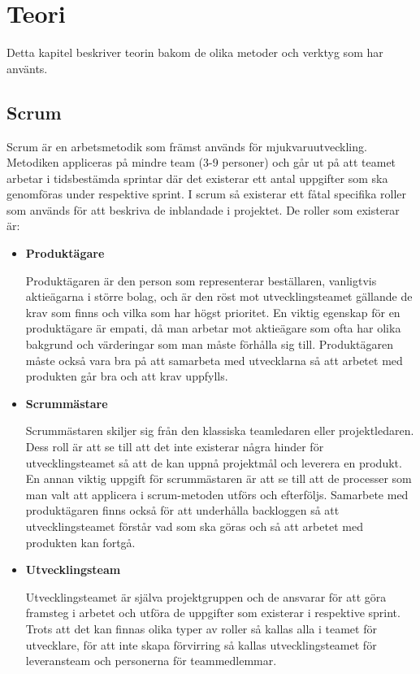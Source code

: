 \chapter{Teori}
Detta kapitel beskriver teorin bakom de olika metoder och verktyg som har använts.

\section{Scrum} \label{scrum}
Scrum är en arbetsmetodik som främst används för mjukvaruutveckling. Metodiken appliceras på mindre team (3-9 personer) och går ut på att teamet arbetar i tidsbestämda sprintar där det existerar ett antal uppgifter som ska genomföras under respektive sprint.
I scrum så existerar ett fåtal specifika roller som används för att beskriva de inblandade i projektet. De roller som existerar är:

\begin{itemize}
	\item \textbf{Produktägare}
	
	Produktägaren är den person som representerar beställaren, vanligtvis aktieägarna i större bolag, och är den röst mot utvecklingsteamet gällande de krav som finns och vilka som har högst prioritet. En viktig egenskap för en produktägare är empati, då man arbetar mot aktieägare som ofta har olika bakgrund och värderingar som man måste förhålla sig till. Produktägaren måste också vara bra på att samarbeta med utvecklarna så att arbetet med produkten går bra och att krav uppfylls.
	
	\item \textbf{Scrummästare}
	
	Scrummästaren skiljer sig från den klassiska teamledaren eller projektledaren. Dess roll är att se till att det inte existerar några hinder för utvecklingsteamet så att de kan uppnå projektmål och leverera en produkt. En annan viktig uppgift för scrummästaren är att se till att de processer som man valt att applicera i scrum-metoden utförs och efterföljs. Samarbete med produktägaren finns också för att underhålla backloggen så att utvecklingsteamet förstår vad som ska göras och så att arbetet med produkten kan fortgå.
	
	\item \textbf{Utvecklingsteam}
	
	Utvecklingsteamet är själva projektgruppen och de ansvarar för att göra framsteg i arbetet och utföra de uppgifter som existerar i respektive sprint. Trots att det kan finnas olika typer av roller så kallas alla i teamet för utvecklare, för att inte skapa förvirring så kallas utvecklingsteamet för leveransteam och personerna för teammedlemmar.	
\end{itemize}

